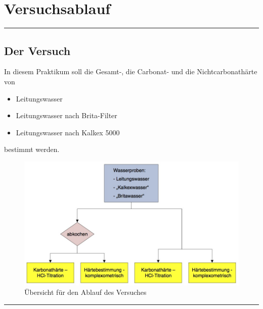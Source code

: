\section{Versuchsablauf}

\rule{\linewidth}{0.5mm}
\subsection{Der Versuch}
\begin{addmargin}[3cm]{0cm}
	In diesem Praktikum soll die Gesamt-, die Carbonat- und die Nichtcarbonathärte von
	
	\begin{itemize}
		\item Leitungswasser
		
		\item Leitungswasser nach Brita-Filter
		
		\item Leitungswasser nach Kalkex 5000
	\end{itemize}
	
	bestimmt werden.
	
	\begin{figure}[H]\centering
		\includegraphics[scale=0.7]{./pictures/uebersichtVersuch.jpg}
		\caption{Übersicht für den Ablauf des Versuches}
		\label{Ablauf}
	\end{figure}
\end{addmargin}


\rule{\linewidth}{0.5mm}
